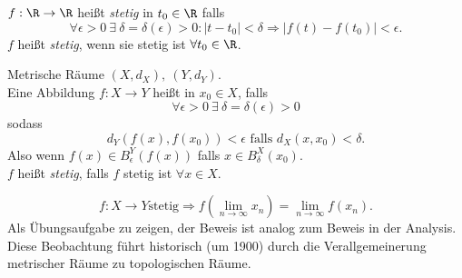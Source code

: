 \begin{remark}
  \( f: \R \to \R \) heißt \emph{stetig} in \( t_0 \in \R \) falls
  \begin{equation*}
    \forall \epsilon > 0 \ \exists \ \delta = \delta(\epsilon) > 0 : \vert t - t_0 \vert < \delta \Rightarrow \vert f(t)-f(t_0) \vert < \epsilon\text{.}
  \end{equation*}
  \( f \) heißt \emph{stetig}, wenn sie stetig ist \( \forall t_0 \in \R \).
\end{remark}

\begin{remark}
  Metrische Räume \( (X, d_X), \ (Y, d_Y) \). \\
  Eine Abbildung \( f: X \to Y \) heißt  in \( x_0 \in X \), falls
  \begin{equation*}
    \forall \epsilon > 0 \ \exists \ \delta = \delta(\epsilon) > 0
  \end{equation*}
  sodass
  \begin{equation*}
    d_Y(f(x), f(x_0)) < \epsilon \text{ falls } d_X(x, x_0) < \delta\text{.}
  \end{equation*}
  Also wenn \( f(x) \in B_\epsilon^Y(f(x)) \) falls \( x \in B_\delta^X(x_0) \). \\
  \( f \) heißt \emph{stetig}, falls \( f \) stetig ist \( \forall x \in X \).
\end{remark}

\begin{remark}
  \begin{equation*}
    f: X \to Y \text{stetig} \Rightarrow f(\lim_{n \to \infty}x_n) = \lim_{n \to \infty}f(x_n)\text{.}
  \end{equation*}
  Als Übungsaufgabe zu zeigen, der Beweis ist analog zum Beweis in der Analysis. \\
  Diese Beobachtung führt historisch (um 1900) durch die Verallgemeinerung metrischer Räume zu topologischen Räume.
\end{remark}